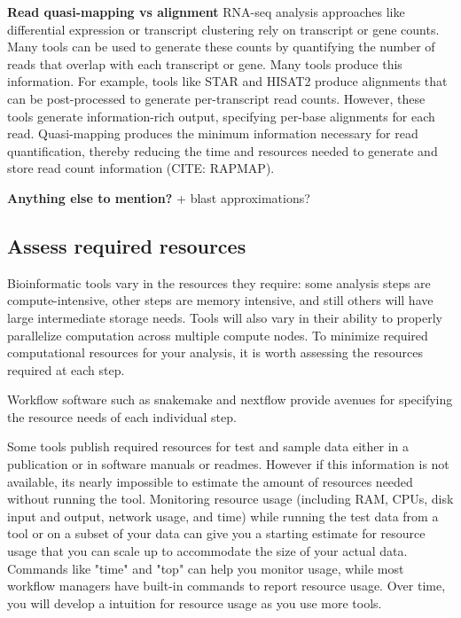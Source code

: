 \documentclass[10pt,letterpaper]{article}
\begin{document}
\textbf{Read quasi-mapping vs alignment} RNA-seq analysis approaches like differential expression or transcript clustering rely on transcript or gene counts.
Many tools can be used to generate these counts by quantifying the number of reads that overlap with each transcript or gene.
Many tools produce this information. 
For example, tools like STAR and HISAT2 produce alignments that can be post-processed to generate per-transcript read counts.
However, these tools generate information-rich output, specifying per-base alignments for each read.
Quasi-mapping produces the minimum information necessary for read quantification, thereby reducing the time and resources needed to generate and store read count information (CITE: RAPMAP). 

\textbf{Anything else to mention?}  
+ blast approximations?

\subsection*{Assess required resources}

Bioinformatic tools vary in the resources they require: some analysis steps are compute-intensive, other steps are memory intensive, and still others will have large intermediate storage needs. 
Tools will also vary in their ability to properly parallelize computation across multiple compute nodes. 
To minimize required computational resources for your analysis, it is worth assessing the resources required at each step.

Workflow software such as snakemake and nextflow provide avenues for specifying the resource needs of each individual step.

Some tools publish required resources for test and sample data either in a publication or in software manuals or readmes. 
However if this information is not available, its nearly impossible to estimate the amount of resources needed without running the tool. 
Monitoring resource usage (including RAM, CPUs, disk input and output, network usage, and time) while running the test data from a tool or on a subset of your data can give you a starting estimate for resource usage that you can scale up to accommodate the size of your actual data. 
Commands like "time" and "top" can help you monitor usage, while most workflow managers have built-in commands to report resource usage. 
Over time, you will develop a intuition for resource usage as you use more tools.
\end{document}
